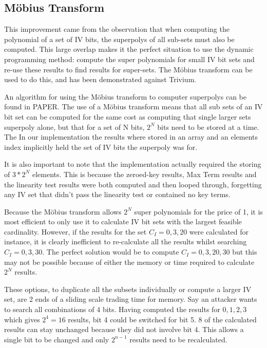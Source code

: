 \documentclass{report}
\let\Oldsubsection\subsection
\renewcommand{\subsection}{\FloatBarrier\Oldsubsection}
\begin{document}
\subsection{M\"{o}bius Transform}
This improvement came from the observation that when computing the polynomial of a set of IV bits, the superpolys of all sub-sets must also be computed. This large overlap makes it the perfect situation to use the dynamic programming method: compute the super polynomials for small IV bit sets and re-use these results to find results for super-sets. The M\"{o}bius transform can be used to do this, and has been demonstrated against Trivium\cite{MobiusTransform}.

An algorithm for using the M\"{o}bius transform to computer superpolys can be found in PAPER.
The use of a M\"{o}bius transform means that all sub sets of an IV bit set can be computed for the same cost as computing that single larger sets superpoly alone, but that for a set of N bits, $2^N$ bits need to be stored at a time. The In our implementation the results where stored in an array and an elements index implicitly held the set of IV bits the superpoly was for.%

It is also important to note that the implementation actually required the storing of $3*2^N$ elements. This is because the zeroed-key results, Max Term results and the linearity test results were both computed and then looped through, forgetting any IV set that didn't pass the linearity test or contained no key terms.

Because the M\"{o}bius transform allows $2^N$ super polynomials for the price of 1, it is most efficient to only use it to calculate IV bit sets with the largest feasible cardinality. However, if the results for the set $C_I={0,3,20}$ were calculated for instance, it is clearly inefficient to re-calculate all the results whilst searching $C_I={0,3,30}$. The perfect solution would be to compute $C_I={0,3,20,30}$ but this may not be possible because of either the memory or time required to calculate $2^N$ results.

These options, to duplicate all the subsets individually or compute a larger IV set, are 2 ends of a sliding scale trading time for memory. Say an attacker wants to search all combinations of 4 bits. Having computed the results for ${0,1,2,3}$ which gives $2^4=16$ results, bit 4 could be switched for bit 5. 8 of the calculated results can stay unchanged because they did not involve bit 4. This allows a single bit to be changed and only $2^{n-1}$ results need to be recalculated.
\end{document}
